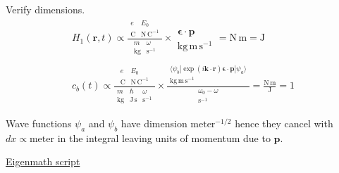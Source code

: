 Verify dimensions.
\begin{gather*}
H_1(\mathbf r,t)
\propto\frac{
\begin{matrix}
e & E_0
\\
\text{C}
& \text{N}\,\text{C}^{-1}
\end{matrix}
}{
\begin{matrix}
m & \omega
\\
\text{kg} & \text{s}^{-1}
\end{matrix}
}
\times
\begin{matrix}
\\
\boldsymbol{\epsilon}\cdot\mathbf p
\\
\text{kg}\,\text{m}\,\text{s}^{-1}
\end{matrix}
=\text{N}\,\text{m}=\text{J}
\\ %
c_b(t)\propto\frac{
\begin{matrix}
e & E_0
\\
\text{C} & \text{N}\,\text{C}^{-1}
\end{matrix}
}{
\begin{matrix}
m & \hbar & \omega
\\
\text{kg} & \text{J}\,\text{s} & \text{s}^{-1}
\end{matrix}
}
\times
\frac{
\begin{matrix}
\\
\langle\psi_b|\exp(i\mathbf k\cdot\mathbf r)\boldsymbol{\epsilon}\cdot\mathbf p|\psi_a\rangle
\\
\text{kg}\,\text{m}\,\text{s}^{-1}
\end{matrix}
}{
\begin{matrix}
\omega_0-\omega
\\
\text{s}^{-1}
\end{matrix}
}
=\frac{\text{N}\,\text{m}}{\text{J}}=1
\end{gather*}

Wave functions $\psi_a$ and $\psi_b$ have dimension $\text{meter}^{-1/2}$
hence they cancel with $dx\propto\text{meter}$ in the integral leaving
units of momentum due to $\mathbf p$.

\bigskip
\href{https://georgeweigt.github.io/examples/atomic-transitions-2-demo.html}{Eigenmath script}


